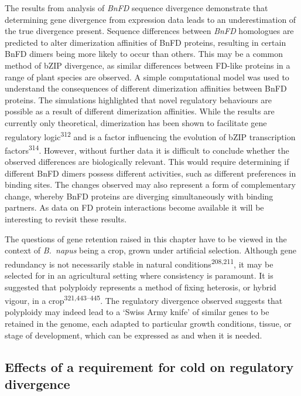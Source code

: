 \documentclass[12pt,]{book}
\begin{document}
The results from analysis of \emph{BnFD} sequence divergence demonstrate
that determining gene divergence from expression data leads to an
underestimation of the true divergence present. Sequence differences
between \emph{BnFD} homologues are predicted to alter dimerization
affinities of BnFD proteins, resulting in certain BnFD dimers being more
likely to occur than others. This may be a common method of bZIP
divergence, as similar differences between FD-like proteins in a range
of plant species are observed. A simple computational model was used to
understand the consequences of different dimerization affinities between
BnFD proteins. The simulations highlighted that novel regulatory
behaviours are possible as a result of different dimerization
affinities. While the results are currently only theoretical,
dimerization has been shown to facilitate gene regulatory
logic\textsuperscript{312} and is a factor influencing the evolution of
bZIP transcription factors\textsuperscript{314}. However, without
further data it is difficult to conclude whether the observed
differences are biologically relevant. This would require determining if
different BnFD dimers possess different activities, such as different
preferences in binding sites. The changes observed may also represent a
form of complementary change, whereby BnFD proteins are diverging
simultaneously with binding partners. As data on FD protein interactions
become available it will be interesting to revisit these results.

The questions of gene retention raised in this chapter have to be viewed
in the context of \emph{B.~napus} being a crop, grown under artificial
selection. Although gene redundancy is not necessarily stable in natural
conditions\textsuperscript{208,211}, it may be selected for in an
agricultural setting where consistency is paramount. It is suggested
that polyploidy represents a method of fixing heterosis, or hybrid
vigour, in a crop\textsuperscript{321,443--445}. The regulatory
divergence observed suggests that polyploidy may indeed lead to a `Swiss
Army knife' of similar genes to be retained in the genome, each adapted
to particular growth conditions, tissue, or stage of development, which
can be expressed as and when it is needed.

\subsection{Effects of a requirement for cold on regulatory
divergence}\label{effects-of-a-requirement-for-cold-on-regulatory-divergence}
\end{document}
